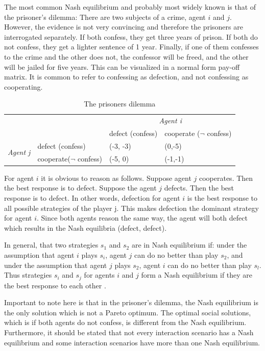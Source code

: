 The most common Nash equilibrium and probably most widely known is that of the prisoner's dilemma:
There are two subjects of a crime, agent $i$ and $j$. However, the evidence is not very convincing and therefore the prisoners are interrogated separately. If both confess, they get three years of prison. If both do not confess, they get a lighter sentence of 1 year. Finally, if one of them confesses to the crime and the other does not, the confessor will be freed, and the other will be jailed for five years.
This can be visualized in a normal form pay-off matrix. It is common to refer to confessing as defection, and not confessing as cooperating.
\begin{table}[h]
\begin{tabular}{llll}
	\toprule 
		&  				& \multicolumn{2}{c}{\textit{Agent i}}\\ 
		\cmidrule{3-4}
	 	&				& defect (confess) 	& cooperate ($\neg$ confess) \\ 
	 	\cmidrule{3-4}
	\multirow{2}{*}{\textit{Agent j}}	& defect (confess)	&  	(-3, -3)			& (0,-5) \\ 
		& cooperate($\neg $ confess) 	&  (-5, 0)				& (-1,-1) \\ 
	\bottomrule
\end{tabular} \label{tab:nashprison} \caption{The prisoners dilemma}
\end{table}
For agent $i$ it is obvious to reason as follows. Suppose agent $j$ cooperates. Then the best response is to defect. Suppose the agent $j$ defects. Then the best response is to defect. In other words, defection for agent $i$ is the best response to all possible strategies of the player j. This makes defection the dominant strategy for agent $i$. Since both agents reason the same way, the agent will both defect which results in the Nash equilibria (defect, defect).

In general, that two strategies $s_1$ and $s_2$ are in Nash equilibrium if: under the assumption that agent $i$ plays $s_i$, agent $j$ can do no better than play $s_2$, and under the assumption that agent $j$ plays $s_2$, agent $i$ can do no better than play $s_l$. Thus strategies $s_i$ and $s_j$ for agents $i$ and $j$ form a Nash equilibrium if they are the best response to each other  \citep{wooldridge2009introduction}. 

Important to note here is that in the prisoner's dilemma, the Nash equilibrium is the only solution which is not a Pareto optimum.  The optimal social solutions, which is if both agents do not confess, is different from the Nash equilibrium.  Furthermore, it should be stated that not every interaction scenario has a Nash equilibrium and some interaction scenarios have more than one Nash equilibrium. 
